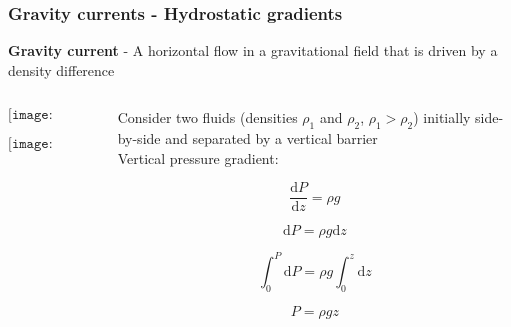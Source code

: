 \documentclass{beamer}
\begin{document}
\begin{frame}
  \frametitle{Gravity currents - Hydrostatic gradients}

  \textbf{Gravity current} - A horizontal flow in a gravitational field that is driven by a density difference \\

  \begin{columns}[t]

    \begin{column}{0.5\paperwidth}

      \vspace{-1cm}
      
      $$\texttt{[image: isostatic.png]}$$

      \vspace{-1cm}
      
      $$\texttt{[image: hydrostat.pdf]}$$
      
    \end{column}

    \begin{column}{0.49\paperwidth}

      \vspace{-0.5cm}
      
      Consider two fluids (densities $\rho_{1}$ and $\rho_{2}$, $\rho_{1} > \rho_{2}$) initially side-by-side and separated by a vertical barrier \\

      Vertical pressure gradient:

      $$ \frac{\mathrm{d} P}{\mathrm{d} z} = \rho g$$

      $$ \mathrm{d} P = \rho g \mathrm{d}z $$

      $$ \int_{0}^{P} \mathrm{d} P = \rho g \int_{0}^{z} \mathrm{d} z $$

      $$ P = \rho g z$$
    \end{column}

  \end{columns}
  
\end{frame}
\end{document}
